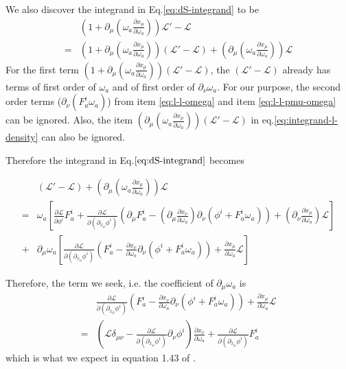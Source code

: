 \documentclass{article}
\begin{document}
We also discover the integrand in Eq.\ref{eq:dS-integrand} to be
\begin{align}
    &\left(1+\partial_\mu(
        \omega_a\frac{\partial x_\mu}{\partial \omega_a})
        \right)\mathcal{L}'-\mathcal{L} 
    \\
    =& 
    \left(
    1+\partial_\mu(\omega_a\frac{\partial x_\mu}{\partial \omega_a})
    \right)
    (\mathcal{L}'-\mathcal{L})
    +
    \left(\partial_\mu(\omega_a\frac{\partial x_\mu}{\partial \omega_a})\right)
    \mathcal{L}
    \label{eq:integrand-l-density}
\end{align}
For the first term 
$\left(
    1+\partial_\mu(\omega_a\frac{\partial x_\mu}{\partial \omega_a})
\right) (\mathcal{L}'-\mathcal{L}) $, the $(\mathcal{L}'-\mathcal{L})$ already
has terms of first order of $\omega_a$ and of first order of
$\partial_\nu\omega_a$. For our purpose, the second order terms
($\partial_\nu(F^i_a\omega_a)$) from item \ref{eq:l-l-omega} and item
\ref{eq:l-l-pmu-omega} can be ignored. Also, the item
$(\partial_\mu(\omega_a\frac{\partial x_\mu}{\partial
\omega_a}))(\mathcal{L}'-\mathcal{L})$ in eq.\ref{eq:integrand-l-density} can
also be ignored.

Therefore the integrand in Eq.$\ref{eq:dS-integrand}$ becomes

\begin{align}
    & (\mathcal{L}'-\mathcal{L})
    +
    \left(\partial_\mu(\omega_a\frac{\partial x_\mu}{\partial \omega_a})\right)
    \mathcal{L} \\
    = & 
    \omega_a
    \left[
        \frac{\partial \mathcal{L}}{\partial\phi^i}F^i_a 
        +
        \frac{\partial \mathcal{L}}{\partial(\partial_{x_\mu}\phi^i)}
        \left(
            \partial_\mu F^i_a 
            - (\partial_\mu\frac{\partial x_\nu}{\partial \omega_a})
            \partial_\nu(\phi^i+F^i_a\omega_a)
        \right)
        +
        (\partial_\nu \frac{\partial x_\mu}{\partial \omega_a})\mathcal{L}
    \right]
    \\
    +&
    \partial_\mu\omega_a
    \left[
        \frac{\partial \mathcal{L}}{\partial(\partial_{x_\mu}\phi^i)}
        \left(
            F^i_a-\frac{\partial x_\nu}{\partial \omega_a}
            \partial_\nu(\phi^i+F^i_a\omega_a)
        \right)
        +
        \frac{\partial x_\mu}{\partial \omega_a}\mathcal{L}
    \right]
\end{align}

Therefore, the term we seek, i.e. the coefficient of $\partial_\mu\omega_a$ is
\begin{align}
  & \frac{\partial \mathcal{L}}{\partial(\partial_{x_\mu}\phi^i)}
    \left(
        F^i_a-\frac{\partial x_\nu}{\partial \omega_a}
        \partial_\nu(\phi^i+F^i_a\omega_a)
    \right)
    +
    \frac{\partial x_\mu}{\partial \omega_a}\mathcal{L} \\
    =&
    \left(
        \mathcal{L}\delta_{\mu\nu}
        -\frac{\partial \mathcal{L}}{\partial(\partial_{x_\mu}\phi^i)}
            \partial_\nu \phi^i
    \right) \frac{\partial x_\nu}{\partial \omega_a}
    +
    \frac{\partial \mathcal{L}}{\partial(\partial_{x_\mu}\phi^i)}F^i_a
\end{align}
which is what we expect in equation 1.43 of \cite{Altland2010a}.
\end{document}
